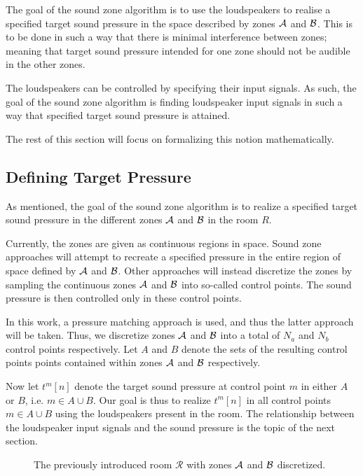 The goal of the sound zone algorithm is to use the loudspeakers to realise a specified target sound pressure
in the space described by zones $\mathcal{A}$ and $\mathcal{B}$.
This is to be done in such a way that there is minimal interference between zones; 
meaning that target sound pressure intended for one zone should not be audible in the other zones.

The loudspeakers can be controlled by specifying their input signals.
As such, the goal of the sound zone algorithm is finding loudspeaker input signals in such a way that 
specified target sound pressure is attained.

The rest of this section will focus on formalizing this notion mathematically.

\subsection{Defining Target Pressure}
\label{sec:sound_zones:data_model:target_pressure}
As mentioned, the goal of the sound zone algorithm is to realize a specified target sound pressure
in the different zones $\mathcal{A}$ and $\mathcal{B}$ in the room $R$.

Currently, the zones are given as continuous regions in space.
Sound zone approaches will attempt to recreate a specified pressure in the entire region of space defined by $\mathcal{A}$ and $\mathcal{B}$.
Other approaches will instead discretize the zones by sampling the continuous zones $\mathcal{A}$ and $\mathcal{B}$ into so-called control points.
The sound pressure is then controlled only in these control points.

In this work, a pressure matching approach is used, and thus the latter approach will be taken.
Thus, we discretize zones $\mathcal{A}$ and $\mathcal{B}$ into a total of $N_a$ and $N_b$ control points respectively.   
Let $A$ and $B$ denote the sets of the resulting control points points contained within zones $\mathcal{A}$ and $\mathcal{B}$ respectively.

Now let $t^{m}[n]$ denote the target sound pressure at control point $m$ in either $A$ or $B$, i.e. $m\in A \cup B$.
Our goal is thus to realize $t^{m}[n]$ in all control points $m\in A \cup B$ using the loudspeakers present in the room.
The relationship between the loudspeaker input signals and the sound pressure is the topic of the next section.

\begin{figure}
    \centering
    
    \caption{The previously introduced room $\mathcal{R}$ with zones $\mathcal{A}$ and $\mathcal{B}$ discretized.}
\end{figure}

